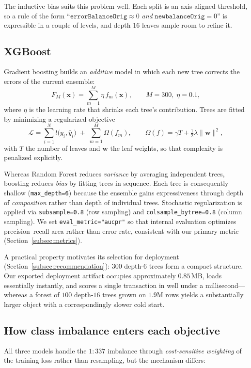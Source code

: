 \documentclass{article}
\begin{document}
The inductive bias suits this problem well. Each split is an
axis-aligned threshold, so a rule of the form
``$\texttt{errorBalanceOrig} \approx 0$ \emph{and}
$\texttt{newbalanceOrig} = 0$'' is expressible in a couple of levels,
and depth $16$ leaves ample room to refine it.

\subsection{XGBoost}
Gradient boosting builds an \emph{additive} model in which each new
tree corrects the errors of the current ensemble:
\begin{equation}
F_M(\mathbf{x}) = \sum_{m=1}^{M} \eta\, f_m(\mathbf{x}),
\qquad M = 300,\; \eta = 0.1,
\label{eq:xgb}
\end{equation}
where $\eta$ is the learning rate that shrinks each tree's
contribution. Trees are fitted by minimizing a regularized objective
\begin{equation}
\mathcal{L} = \sum_{i=1}^{N} l\bigl(y_i, \hat y_i\bigr)
 \;+\; \sum_{m=1}^{M} \Omega(f_m),
\qquad
\Omega(f) = \gamma T + \tfrac{1}{2}\lambda \lVert \mathbf{w}\rVert^2,
\label{eq:xgbobj}
\end{equation}
with $T$ the number of leaves and $\mathbf{w}$ the leaf weights, so
that complexity is penalized explicitly.

Whereas Random Forest reduces \emph{variance} by averaging independent
trees, boosting reduces \emph{bias} by fitting trees in sequence. Each
tree is consequently shallow (\texttt{max\_depth=6}) because the
ensemble gains expressiveness through depth of \emph{composition}
rather than depth of individual trees. Stochastic regularization is
applied via \texttt{subsample=0.8} (row sampling) and
\texttt{colsample\_bytree=0.8} (column sampling). We set
\texttt{eval\_metric="aucpr"} so that internal evaluation optimizes
precision--recall area rather than error rate, consistent with our
primary metric (Section~\ref{subsec:metrics}).

A practical property motivates its selection for deployment
(Section~\ref{subsec:recommendation}): $300$ depth-$6$ trees form a
compact structure. Our exported deployment artifact occupies
approximately $0.85$\,MB, loads essentially instantly, and scores a
single transaction in well under a millisecond---whereas a forest of
$100$ depth-$16$ trees grown on $1.9$M rows yields a substantially
larger object with a correspondingly slower cold start.

\subsection{How class imbalance enters each objective}
\label{subsec:weighting}
All three models handle the $1{:}337$ imbalance through
\emph{cost-sensitive weighting} of the training loss rather than
resampling, but the mechanism differs:
\end{document}
